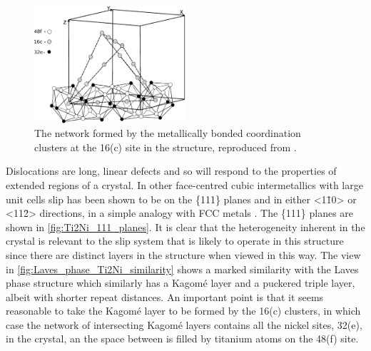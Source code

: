 \begin{figure}
\centering
\includegraphics[width=0.5\textwidth]{Ti2Ni_16c_sites}
\caption{The network formed by the metallically bonded coordination clusters at the 16(c) site in the  structure, reproduced from \cite{Ivanovic2006}.\label{fig:16c_network_Ti2Ni}}
\end{figure}


Dislocations are long, linear defects and so will respond to the properties of extended regions of a crystal. In other face-centred cubic intermetallics with large unit cells slip has been shown to be on the \{111\} planes and in either <1\={1}0> or <11\={2}> directions, in a simple analogy with FCC metals \cite{Davis2015}. The \{111\} planes are shown in \autoref{fig:Ti2Ni_111_planes}. It is clear that the heterogeneity inherent in the crystal is relevant to the slip system that is likely to operate in this structure since there are distinct layers in the structure when viewed in this way. The view in \autoref{fig:Laves_phase_Ti2Ni_similarity} shows a marked similarity with the Laves phase structure which similarly has a Kagom\'{e} layer and a puckered triple layer, albeit with shorter repeat distances. An important point is that it seems reasonable to take the Kagom\'{e} layer to be formed by the 16(c) clusters, in which case the network of intersecting Kagom\'e layers contains all the nickel sites, 32(e), in the crystal, an the space between is filled by titanium atoms on the 48(f) site.


